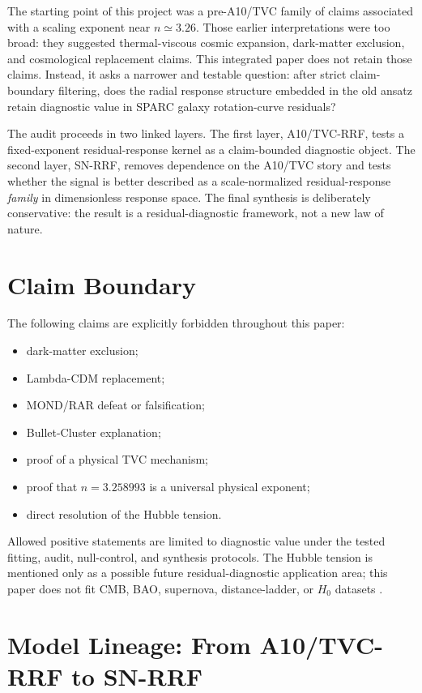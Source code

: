 \documentclass[11pt,a4paper]{article}
\begin{document}
The starting point of this project was a pre-A10/TVC family of claims associated with a scaling exponent near $n\simeq 3.26$. Those earlier interpretations were too broad: they suggested thermal-viscous cosmic expansion, dark-matter exclusion, and cosmological replacement claims. This integrated paper does not retain those claims. Instead, it asks a narrower and testable question: after strict claim-boundary filtering, does the radial response structure embedded in the old ansatz retain diagnostic value in SPARC galaxy rotation-curve residuals?

The audit proceeds in two linked layers. The first layer, A10/TVC-RRF, tests a fixed-exponent residual-response kernel as a claim-bounded diagnostic object. The second layer, SN-RRF, removes dependence on the A10/TVC story and tests whether the signal is better described as a scale-normalized residual-response \emph{family} in dimensionless response space. The final synthesis is deliberately conservative: the result is a residual-diagnostic framework, not a new law of nature.

\section{Claim Boundary}
The following claims are explicitly forbidden throughout this paper:
\begin{itemize}
  \item dark-matter exclusion;
  \item Lambda-CDM replacement;
  \item MOND/RAR defeat or falsification;
  \item Bullet-Cluster explanation;
  \item proof of a physical TVC mechanism;
  \item proof that $n=3.258993$ is a universal physical exponent;
  \item direct resolution of the Hubble tension.
\end{itemize}

Allowed positive statements are limited to diagnostic value under the tested fitting, audit, null-control, and synthesis protocols. The Hubble tension is mentioned only as a possible future residual-diagnostic application area; this paper does not fit CMB, BAO, supernova, distance-ladder, or $H_0$ datasets \cite{Planck2020,Riess2022}.

\section{Model Lineage: From A10/TVC-RRF to SN-RRF}
\end{document}
